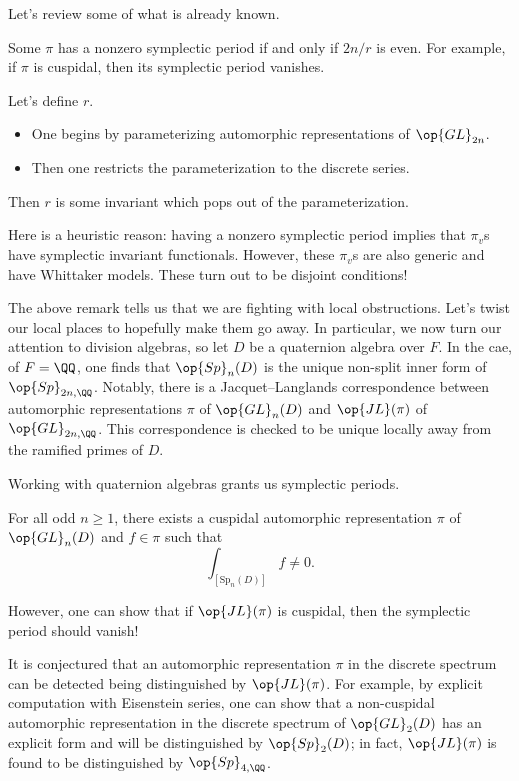 \documentclass{article}
\begin{document}
Let's review some of what is already known.
\begin{theorem}
	Some $\pi$ has a nonzero symplectic period if and only if $2n/r$ is even. For example, if $\pi$ is cuspidal, then its symplectic period vanishes.
\end{theorem}
Let's define $r$.
\begin{itemize}
	\item One begins by parameterizing automorphic representations of $\op{GL}_{2n}$.
	\item Then one restricts the parameterization to the discrete series.
\end{itemize}
Then $r$ is some invariant which pops out of the parameterization.
\begin{remark}
	Here is a heuristic reason: having a nonzero symplectic period implies that $\pi_v$s have symplectic invariant functionals. However, these $\pi_v$s are also generic and have Whittaker models. These turn out to be disjoint conditions!
\end{remark}
The above remark tells us that we are fighting with local obstructions. Let's twist our local places to hopefully make them go away. In particular, we now turn our attention to division algebras, so let $D$ be a quaternion algebra over $F$. In the cae, of $F=\QQ$, one finds that $\op{Sp}_n(D)$ is the unique non-split inner form of $\op{Sp}_{2n,\QQ}$. Notably, there is a Jacquet--Langlands correspondence between automorphic representations $\pi$ of $\op{GL}_n(D)$ and $\op{JL}(\pi)$ of $\op{GL}_{2n,\QQ}$. This correspondence is checked to be unique locally away from the ramified primes of $D$.

Working with quaternion algebras grants us symplectic periods.
\begin{proposition}
	For all odd $n\ge1$, there exists a cuspidal automorphic representation $\pi$ of $\op{GL}_n(D)$ and $f\in\pi$ such that
	\[\int_{[\mathrm{Sp}_{n}(D)]}f\ne0.\]
\end{proposition}
\begin{remark}
	However, one can show that if $\op{JL}(\pi)$ is cuspidal, then the symplectic period should vanish!
\end{remark}
\begin{remark}
	It is conjectured that an automorphic representation $\pi$ in the discrete spectrum can be detected being distinguished by $\op{JL}(\pi)$. For example, by explicit computation with Eisenstein series, one can show that a non-cuspidal automorphic representation in the discrete spectrum  of $\op{GL}_2(D)$ has an explicit form and will be distinguished by $\op{Sp}_2(D)$; in fact, $\op{JL}(\pi)$ is found to be distinguished by $\op{Sp}_{4,\QQ}$.
\end{remark}
\end{document}
